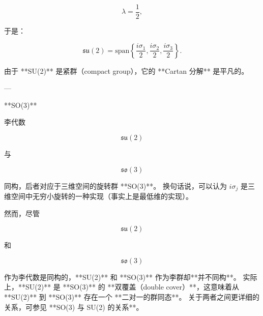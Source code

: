 $$
\lambda = \frac{1}{2},
$$

于是：

$$
\mathfrak{su}(2) = \text{span} \left\{ \frac{i\sigma_1}{2}, \frac{i\sigma_2}{2}, \frac{i\sigma_3}{2} \right\}.
$$

由于 **SU(2)** 是紧群（compact group），它的 **Cartan 分解** 是平凡的。

---

**SO(3)**

李代数

$$
\mathfrak{su}(2)
$$

与

$$
\mathfrak{so}(3)
$$

同构，后者对应于三维空间的旋转群 **SO(3)**。
换句话说，可以认为 $i\sigma_j$ 是三维空间中无穷小旋转的一种实现（事实上是最低维的实现）。

然而，尽管

$$
\mathfrak{su}(2)
$$

和

$$
\mathfrak{so}(3)
$$

作为李代数是同构的，**SU(2)** 和 **SO(3)** 作为李群却**并不同构**。
实际上，**SU(2)** 是 **SO(3)** 的 **双覆盖（double cover）**，这意味着从 **SU(2)** 到 **SO(3)** 存在一个 **二对一的群同态**。
关于两者之间更详细的关系，可参见 **SO(3) 与 SU(2) 的关系**。
